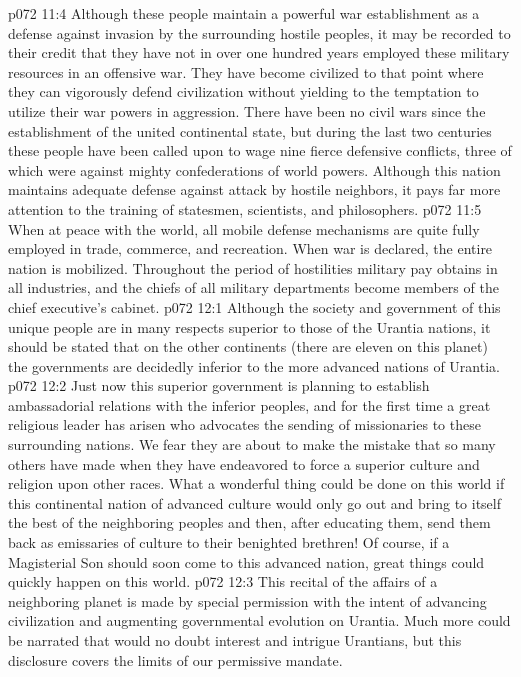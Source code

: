 \pc \vs p072 11:4 Although these people maintain a powerful war establishment as a defense against invasion by the surrounding hostile peoples, it may be recorded to their credit that they have not in over one hundred years employed these military resources in an offensive war. They have become civilized to that point where they can vigorously defend civilization without yielding to the temptation to utilize their war powers in aggression. There have been no civil wars since the establishment of the united continental state, but during the last two centuries these people have been called upon to wage nine fierce defensive conflicts, three of which were against mighty confederations of world powers. Although this nation maintains adequate defense against attack by hostile neighbors, it pays far more attention to the training of statesmen, scientists, and philosophers.\plusone
\vs p072 11:5 When at peace with the world, all mobile defense mechanisms are quite fully employed in trade, commerce, and recreation. When war is declared, the entire nation is mobilized. Throughout the period of hostilities military pay obtains in all industries, and the chiefs of all military departments become members of the chief executive’s cabinet.
\vs p072 12:1 Although the society and government of this unique people are in many respects superior to those of the Urantia nations, it should be stated that on the other continents (there are eleven on this planet) the governments are decidedly inferior to the more advanced nations of Urantia.
\vs p072 12:2 Just now this superior government is planning to establish ambassadorial relations with the inferior peoples, and for the first time a great religious leader has arisen who advocates the sending of missionaries to these surrounding nations. We fear they are about to make the mistake that so many others have made when they have endeavored to force a superior culture and religion upon other races. What a wonderful thing could be done on this world if this continental nation of advanced culture would only go out and bring to itself the best of the neighboring peoples and then, after educating them, send them back as emissaries of culture to their benighted brethren! Of course, if a Magisterial Son should soon come to this advanced nation, great things could quickly happen on this world.
\pc \vs p072 12:3 This recital of the affairs of a neighboring planet is made by special permission with the intent of advancing civilization and augmenting governmental evolution on Urantia. Much more could be narrated that would no doubt interest and intrigue Urantians, but this disclosure covers the limits of our permissive mandate.
